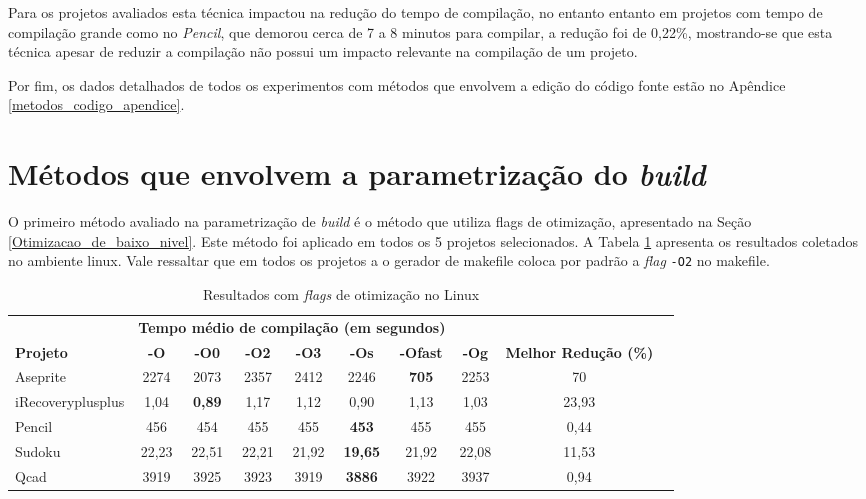 Para os projetos avaliados esta técnica impactou na redução do tempo de compilação, no entanto entanto em projetos com tempo de compilação grande como no \textit{Pencil}, que demorou cerca de 7 a 8 minutos para compilar, a redução foi de 0,22\%, mostrando-se que esta técnica apesar de reduzir a compilação não possui um impacto relevante na compilação de um projeto.

Por fim, os dados detalhados de todos os experimentos com métodos que envolvem a edição do código fonte estão no Apêndice \ref{metodos_codigo_apendice}.

\section{Métodos que envolvem a parametrização do \textit{build}}


O primeiro método avaliado na parametrização de \textit{build} é o
 método que utiliza flags de otimização,
 apresentado na Seção \ref{Otimizacao_de_baixo_nivel}. Este método foi
 aplicado em todos os 5 projetos selecionados. A Tabela 
\ref{tab:flags_otimizacao:linux} apresenta os resultados coletados no ambiente linux.
 Vale ressaltar que em todos os projetos a o gerador de makefile coloca por padrão a \textit{flag} \texttt{-O2} no makefile.
 
\begin{table}[!ht]
\tiny
\centering
\caption{Resultados com \textit{flags} de otimização no Linux}
\label{tab:flags_otimizacao:linux}
\begin{tabular}{lccccccccc}
& \multicolumn{6}{c}{\textbf{Tempo médio de compilação (em segundos)} } \\
 \textbf{Projeto}& \textbf{-O}  & \textbf{-O0}   & \textbf{-O2} & \textbf{-O3} & \textbf{-Os} & \textbf{-Ofast} & \textbf{-Og} & \textbf{Melhor Redução (\%)}\\ \toprule
Aseprite            & 2274  & 2073          & 2357  & 2412  & 2246              & \textbf{705} & 2253 & 70 \\
iRecoveryplusplus   & 1,04  & \textbf{0,89} &  1,17 & 1,12  & 0,90              & 1,13  & 1,03 & 23,93 \\
Pencil              & 456   & 454           &  455  & 455   & \textbf{453}      & 455   & 455 & 0,44\\
Sudoku              & 22,23 & 22,51         & 22,21 & 21,92 & \textbf{19,65}    & 21,92 & 22,08 &  11,53 \\ 
Qcad                & 3919  &  3925         &  3923 & 3919  & \textbf{3886}     & 3922  & 3937 & 0,94  \\ 
\end{tabular}
\end{table}


